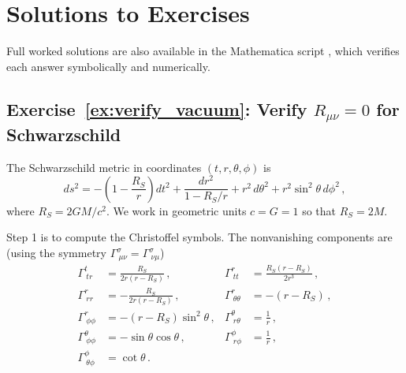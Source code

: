 
\section{Solutions to Exercises}
\label{sec:schwarzschild_solutions}

\noindent
Full worked solutions are also available in the Mathematica script
,
which verifies each answer symbolically and numerically.

\subsection*{Exercise~\ref{ex:verify_vacuum}: Verify $R_{\mu\nu} = 0$ for Schwarzschild}

The Schwarzschild metric in coordinates $(t, r, \theta, \phi)$ is
\begin{equation*}
    ds^2 = -\!\left(1 - \frac{R_S}{r}\right) dt^2
           + \frac{dr^2}{1 - R_S/r}
           + r^2\, d\theta^2
           + r^2 \sin^2\!\theta\, d\phi^2 \,,
\end{equation*}
where $R_S = 2GM/c^2$.  We work in geometric units $c = G = 1$ so that $R_S = 2M$.

Step 1 is to compute the Christoffel symbols.
The nonvanishing components are (using the symmetry $\Gamma^\sigma_{\ \mu\nu} = \Gamma^\sigma_{\ \nu\mu}$)
\begin{align*}
    \Gamma^t_{\ tr} &= \frac{R_S}{2r(r - R_S)} \,,
    &\Gamma^r_{\ tt} &= \frac{R_S(r - R_S)}{2r^3} \,, \\
    \Gamma^r_{\ rr} &= -\frac{R_S}{2r(r - R_S)} \,,
    &\Gamma^r_{\ \theta\theta} &= -(r - R_S) \,, \\
    \Gamma^r_{\ \phi\phi} &= -(r - R_S)\sin^2\!\theta \,,
    &\Gamma^\theta_{\ r\theta} &= \frac{1}{r} \,, \\
    \Gamma^\theta_{\ \phi\phi} &= -\sin\theta\cos\theta \,,
    &\Gamma^\phi_{\ r\phi} &= \frac{1}{r} \,, \\
    \Gamma^\phi_{\ \theta\phi} &= \cot\theta \,.
\end{align*}

